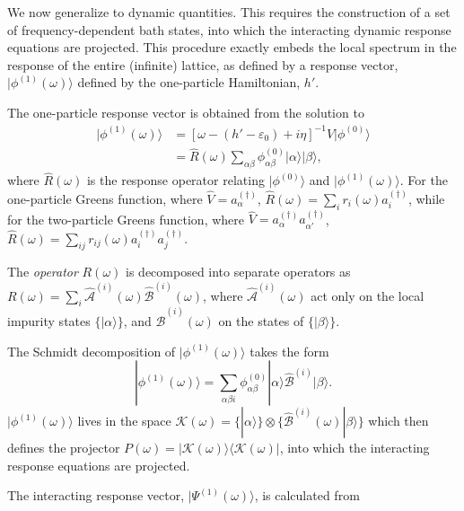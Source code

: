 \documentclass[aps,twocolumn,nobibnotes]{revtex4}
\begin{document}
We now generalize to dynamic quantities. This requires the construction of a set of frequency-dependent bath states, into which the
interacting dynamic response equations are projected. This procedure exactly embeds the local spectrum in the response of the entire (infinite) lattice, 
as defined by a response vector, $|\phi^{(1)}(\omega) \rangle$ defined by the one-particle Hamiltonian, $h'$.
\begin{inparaenum}
\item The one-particle response vector is obtained from the solution to
\begin{align}
|\phi^{(1)}(\omega) \rangle &= \left[ \omega-(h'-\varepsilon_0)+i\eta \right]^{-1} {\hat V} |\phi^{(0)}\rangle  \nonumber \\ 
                            &= {\hat R}(\omega) \sum_{\alpha \beta} \phi^{(0)}_{\alpha \beta} |\alpha \rangle |\beta \rangle    ,
\end{align}
where ${\hat R}(\omega)$ is the response operator relating $| \phi^{(0)} \rangle$ and $| \phi^{(1)}(\omega) \rangle$. For the one-particle Greens 
function, where ${\hat V} = a_{\alpha}^{(\dagger)}$, ${\hat R}(\omega) = \sum_i r_i(\omega) a_i^{(\dagger)}$, while for the two-particle Greens function, 
where ${\hat V}=a_{\alpha}^{(\dagger)} a_{\alpha'}^{(\dagger)}$, ${\hat R}(\omega) = \sum_{ij} r_{ij}(\omega) a_i^{(\dagger)} a_j^{(\dagger)}$.
\item The {\em operator} $R(\omega)$ is decomposed into separate operators as $R(\omega) = \sum_i {\hat {\mathcal{A}}}^{(i)}(\omega) {\hat {\mathcal{B}}}^{(i)}(\omega)$, 
where ${\hat {\mathcal{A}}}^{(i)}(\omega)$ act only on the local impurity states $\{ |\alpha \rangle \}$, and ${\hat {\mathcal{B}}}^{(i)}(\omega)$ on the states of $\{ |\beta\rangle \}$.
\item The Schmidt decomposition of $| \phi^{(1)}(\omega) \rangle$ takes the form
\begin{equation}
|\phi^{(1)}(\omega) \rangle = \sum_{\alpha \beta i} \phi^{(0)}_{\alpha \beta} |\alpha \rangle {\hat {\mathcal{B}}}^{(i)} |\beta \rangle .
\end{equation}
$| \phi^{(1)}(\omega) \rangle$ lives in the space $\mathcal{K}(\omega) = \{ |\alpha \rangle \} \otimes \{\hat {\mathcal{B}}^{(i)}(\omega) | \beta \rangle \}$ which 
then defines the projector $P(\omega) = |\mathcal{K}(\omega)\rangle \langle \mathcal{K}(\omega) |$, into which the interacting response equations are projected.
\item The interacting response vector, $|\Psi^{(1)} (\omega) \rangle$, is calculated from

\end{inparaenum}
\end{document}
